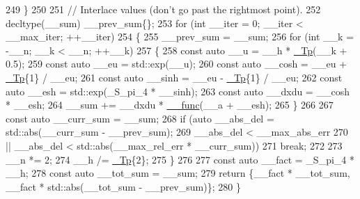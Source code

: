 \begin{DoxyCode}
249         \}
250 
251       \textcolor{comment}{// Interlace values (don't go past the rightmost point).}
252       decltype(\_\_sum) \_\_prev\_sum\{\};
253       \textcolor{keywordflow}{for} (\textcolor{keywordtype}{int} \_\_iter = 0; \_\_iter < \_\_max\_iter; ++\_\_iter)
254         \{
255           \_\_prev\_sum = \_\_sum;
256           \textcolor{keywordflow}{for} (\textcolor{keywordtype}{int} \_\_k  = -\_\_n; \_\_k < \_\_n; ++\_\_k)
257             \{
258               \textcolor{keyword}{const} \textcolor{keyword}{auto} \_\_u = \_\_h * \hyperlink{namespace____gnu__cxx_a3b19a9c800ca194374ef9172290f7d79}{\_Tp}(\_\_k + 0.5);
259               \textcolor{keyword}{const} \textcolor{keyword}{auto} \_\_eu = std::exp(\_\_u);
260               \textcolor{keyword}{const} \textcolor{keyword}{auto} \_\_cosh = \_\_eu + \hyperlink{namespace____gnu__cxx_a3b19a9c800ca194374ef9172290f7d79}{\_Tp}\{1\} / \_\_eu;
261               \textcolor{keyword}{const} \textcolor{keyword}{auto} \_\_sinh = \_\_eu - \hyperlink{namespace____gnu__cxx_a3b19a9c800ca194374ef9172290f7d79}{\_Tp}\{1\} / \_\_eu;
262               \textcolor{keyword}{const} \textcolor{keyword}{auto} \_\_esh = std::exp(\_S\_pi\_4 * \_\_sinh);
263               \textcolor{keyword}{const} \textcolor{keyword}{auto} \_\_dxdu = \_\_cosh * \_\_esh;
264               \_\_sum += \_\_dxdu * \hyperlink{namespace____gnu__cxx_af2b2f0c7a2ae72b922b1afefae5a65b2}{\_\_func}(\_\_a + \_\_esh);
265             \}
266 
267           \textcolor{keyword}{const} \textcolor{keyword}{auto} \_\_curr\_sum = \_\_sum;
268           \textcolor{keywordflow}{if} (\textcolor{keyword}{auto} \_\_abs\_del = std::abs(\_\_curr\_sum - \_\_prev\_sum);
269               \_\_abs\_del < \_\_max\_abs\_err
270               || \_\_abs\_del < std::abs(\_\_max\_rel\_err * \_\_curr\_sum))
271             \textcolor{keywordflow}{break};
272 
273           \_\_n *= 2;
274           \_\_h /= \hyperlink{namespace____gnu__cxx_a3b19a9c800ca194374ef9172290f7d79}{\_Tp}\{2\};
275         \}
276 
277       \textcolor{keyword}{const} \textcolor{keyword}{auto} \_\_fact = \_S\_pi\_4 * \_\_h;
278       \textcolor{keyword}{const} \textcolor{keyword}{auto} \_\_tot\_sum = \_\_sum;
279       \textcolor{keywordflow}{return} \{\_\_fact * \_\_tot\_sum, \_\_fact * std::abs(\_\_tot\_sum - \_\_prev\_sum)\};
280     \}
\end{DoxyCode}
\mbox{\label{namespace____gnu__cxx_a3ab6a5df23f812f6760750d8fb4b3098}} 
